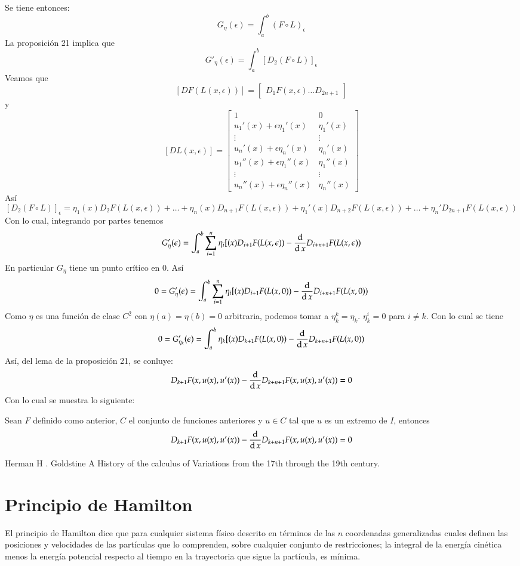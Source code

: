 Se tiene entonces:
\[
  G_{\eta}(\epsilon) = \int_a^b (F \circ L)_{\epsilon}
\]
La proposición 21 implica que
\[
  G'_{\eta}(\epsilon) = \int_a^b [D_2 (F \circ L)]_{\epsilon}
\]
Veamos que 
\[
  [D F(L(x,\epsilon))] =%
  \begin{bmatrix}%
    D_1F(x,\epsilon) \ldots D_{2n +1}%
  \end{bmatrix}
\]
y
\[
  [D L(x, \epsilon)] =%
  \begin{bmatrix}%
    1 & 0 \\
    u_1'(x) + \epsilon\eta_1'(x) & \eta_1'(x) \\
    \vdots & \vdots \\
    u_n'(x) + \epsilon\eta_n'(x) & \eta_n'(x) \\
    u_1''(x) + \epsilon\eta_1''(x) & \eta_1''(x) \\
    \vdots & \vdots \\
    u_n''(x) + \epsilon\eta_n''(x) & \eta_n''(x)
  \end{bmatrix}
\]
Así 
\[
  [D_2(F\circ L)]_{\epsilon} = \eta_1(x)D_2F(L(x,\epsilon)) + \ldots%
  + \eta_n(x)D_{n+1}F(L(x,\epsilon)) +%
  \eta_1'(x)D_{n+2}F(L(x,\epsilon)) +\ldots %
  +\eta_n'D_{2n+1}F(L(x,\epsilon))
\]
Con lo cual, integrando por partes tenemos
\[
  G'_{\eta}(\epsilon) = \int_a^b \sum_{i=1}^n \eta_i[(x)D_{i+1}F(L(x,\epsilon)) -%
  \frac{\diff}{\diff{x}}D_{i+n+1}F(L(x,\epsilon))
\]
En particular $G_{\eta}$ tiene un punto crítico en 0. Así
\[
  0 = G'_{\eta}(\epsilon) = \int_a^b \sum_{i=1}^n \eta_i[(x)D_{i+1}F(L(x,0)) -%
  \frac{\diff}{\diff{x}}D_{i+n+1}F(L(x,0))
\]
Como $\eta$ es una función de clase $C^2$ con $\eta(a)=\eta(b)=0$ arbitraria,
podemos tomar a $\eta^k_k = \eta_k$. $\eta_k^i=0$ para $i \neq k$. Con lo cual
se tiene
\[
  0 = G'_{\eta_k}(\epsilon) = \int_a^b  \eta_k[(x)D_{k+1}F(L(x,0)) -%
  \frac{\diff}{\diff{x}}D_{k+n+1}F(L(x,0))
\]
Así, del lema de la proposición 21, se conluye:
\[
  D_{k+1} F(x, u(x), u'(x)) - \frac{\operatorname{d}}{\operatorname{d} x} D_{k+n+1}F(x,u(x),u'(x)) = 0
\]
Con lo cual se muestra lo siguiente:
\begin{proposition}
 Sean $F$ definido como anterior, $C$ el conjunto de funciones anteriores y $u
 \in C$ tal que $u $ es un extremo de $I$, entonces 
\[
  D_{k+1} F(x, u(x), u'(x)) - \frac{\operatorname{d}}{\operatorname{d} x} D_{k+n+1}F(x,u(x),u'(x)) = 0
\]
\end{proposition}
Herman  H . Goldstine A History of the calculus of Variations from the 17th
through the 19th century.
\section{Principio de Hamilton}
El principio de Hamilton dice que
para cualquier sistema físico descrito en términos de las $n$ coordenadas
generalizadas cuales definen las posiciones y velocidades de las partículas que
lo comprenden, sobre cualquier conjunto de restricciones; la integral de la
energía cinética menos la energía potencial respecto al tiempo en la trayectoria
que sigue la partícula, es mínima.

